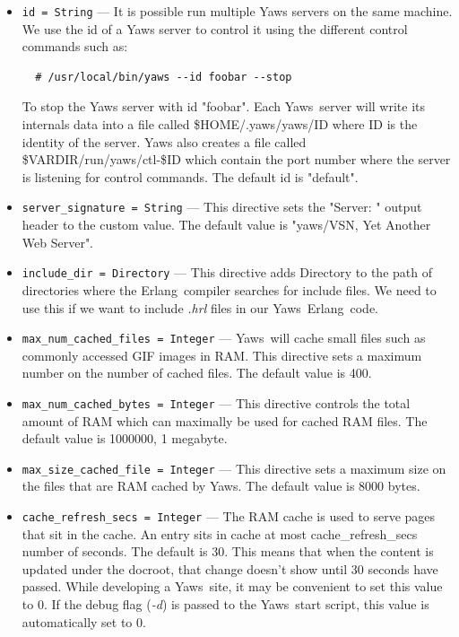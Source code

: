 \documentclass[11pt,oneside,english]{book}
\newcommand{\Erlang}            %
        {{\sc Erlang}}
\newcommand{\Yaws}            %
        {{\sc Yaws}}
\begin{document}
\begin{itemize}
\item        \verb+id = String+ ---
              It is possible run multiple Yaws servers on the same machine. We
              use the id of a Yaws server to control it using the different
              control commands such as:
\begin{verbatim}
  # /usr/local/bin/yaws --id foobar --stop
\end{verbatim}
               To stop the Yaws server with id "foobar". Each \Yaws\ server will
               write its internals data into a file called \$HOME/.yaws/yaws/ID
               where ID is the identity of the server. Yaws also creates a file
               called \${VARDIR}/run/yaws/ctl-\${ID} which contain the port
               number where the server is listening for control commands. The
               default id is "default".

\item        \verb+server_signature = String+ ---
              This directive sets the "Server: " output header to the custom
              value. The default value is "yaws/VSN, Yet Another Web Server".

\item        \verb+include_dir = Directory+ ---
              This directive adds Directory to the path of directories
               where  the  \Erlang\   compiler  searches  for
              include  files.  We  need to use this if we want to
              include \textit{.hrl} files in our \Yaws\  \Erlang\  code.

\item        \verb+max_num_cached_files = Integer+ ---
              \Yaws\   will  cache  small  files  such  as  commonly
              accessed  GIF images in RAM.  This directive sets a
              maximum number on the number of cached files.   The
              default value is 400.

\item        \verb+max_num_cached_bytes = Integer+ ---
              This  directive  controls  the  total amount of RAM
              which can maximally be used for cached  RAM  files.
              The default value is 1000000, 1 megabyte.

\item        \verb+max_size_cached_file = Integer+ ---
              This  directive  sets  a  maximum size on the files
              that are RAM cached by \Yaws{}.  The default value is
              8000 bytes.

\item        \verb+cache_refresh_secs = Integer+ ---
              The  RAM  cache  is used to serve pages that sit in
              the  cache.  An  entry  sits  in  cache   at   most
              cache\_refresh\_secs  number  of seconds. The default
              is 30. This means that when the content is  updated
              under  the  docroot, that change doesn't show until
              30 seconds have passed.  While  developing  a  \Yaws\
              site,  it may be convenient to set this value to 0.
              If the debug flag (\textit{-d}) is passed to the
              \Yaws\   start script, this value is automatically set
              to 0.


\end{itemize}
\end{document}
